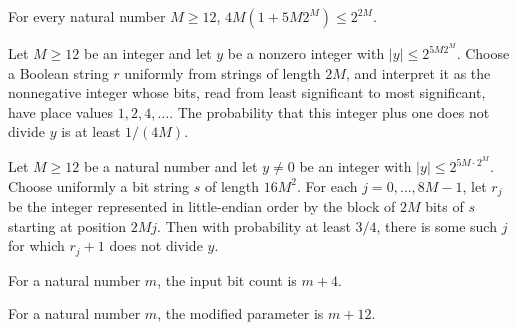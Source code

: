 \begin{theorem}
\label{Randomized.four_mul_le_four_pow}
\leanok
{}
For every natural number $M\ge 12$, $4M(1+5M2^M)\le 2^{2M}$.
\end{theorem}

\begin{theorem}
\label{Randomized.fingerprint}
\leanok
{}
Let $M\ge12$ be an integer and let $y$ be a nonzero integer with $|y|\le 2^{5M2^M}$.
Choose a Boolean string $r$ uniformly from strings of length $2M$, and interpret it as
the nonnegative integer whose bits, read from least significant to most significant,
have place values $1,2,4,\ldots$. The probability that this integer plus one does not
divide $y$ is at least $1/(4M)$.
\end{theorem}

\begin{theorem}
\label{Randomized.prob_exists_not_dvd}
\leanok
{}
Let $M\ge12$ be a natural number and let $y\ne0$ be an integer with
$|y|\le2^{5M\cdot2^M}$. Choose uniformly a bit string $s$ of length $16M^2$. For each
$j=0,\ldots,8M-1$, let $r_j$ be the integer represented in little-endian order by the
block of $2M$ bits of $s$ starting at position $2Mj$. Then with probability at least
$3/4$, there is some such $j$ for which $r_j+1$ does not divide $y$.
\end{theorem}

\begin{definition}
\label{Randomized.inputBits}
\leanok
For a natural number $m$, the input bit count is $m+4$.
\end{definition}

\begin{definition}
\label{Randomized.modParam}
\leanok
For a natural number $m$, the modified parameter is $m+12$.
\end{definition}


